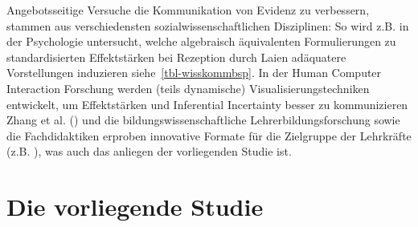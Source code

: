 \documentclass[
  jou,
  floatsintext,
  longtable,
  nolmodern,
  notxfonts,
  notimes,
  colorlinks=true,linkcolor=blue,citecolor=blue,urlcolor=blue]{apa7}
\begin{document}
Angebotsseitige Versuche die Kommunikation von Evidenz zu verbessern,
stammen aus verschiedensten sozialwissenschaftlichen Disziplinen: So
wird z.B. in der Psychologie untersucht, welche algebraisch äquivalenten
Formulierungen zu standardisierten Effektstärken bei Rezeption durch
Laien adäquatere Vorstellungen induzieren siehe~\ref{tbl-wisskommbsp}.
In der Human Computer Interaction Forschung werden (teils dynamische)
Visualisierungstechniken entwickelt, um Effektstärken und Inferential
Incertainty besser zu kommunizieren Zhang et al.
() und die bildungswissenschaftliche
Lehrerbildungsforschung sowie die Fachdidaktiken erproben innovative
Formate für die Zielgruppe der Lehrkräfte (z.B.
), was auch das
anliegen der vorliegenden Studie ist.

\begin{ThreePartTable}

\begin{table}

\caption{\label{tbl-wisskommbsp}Beispiele für angebotsseitige Versuche
verbesserter Kommunikation von Evidenz}


\end{table}%

\end{ThreePartTable}

\section{Die vorliegende Studie}\label{die-vorliegende-studie}
\end{document}
